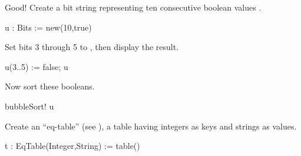 \begin{xtc}
\begin{xtccomment}
Good! Create a bit string representing ten consecutive
boolean values .
\end{xtccomment}
\begin{spadsrc}
u : Bits := new(10,true)
\end{spadsrc}
\begin{TeXOutput}
\begin{fricasmath}{7}
%
\end{fricasmath}
\end{TeXOutput}
\end{xtc}
\begin{xtc}
\begin{xtccomment}
Set bits 3 through 5 to , then display the result.
\end{xtccomment}
\begin{spadsrc}
u(3..5) := false; u
\end{spadsrc}
\begin{TeXOutput}
\begin{fricasmath}{8}
%
\end{fricasmath}
\end{TeXOutput}
\end{xtc}
\begin{xtc}
\begin{xtccomment}
Now sort these booleans.
\end{xtccomment}
\begin{spadsrc}
bubbleSort! u
\end{spadsrc}
\begin{TeXOutput}
\begin{fricasmath}{9}
%
\end{fricasmath}
\end{TeXOutput}
\end{xtc}
\begin{xtc}
\begin{xtccomment}
Create an ``eq-table'' (see ), a
table having integers as keys
and strings as values.
\end{xtccomment}
\begin{spadsrc}
t : EqTable(Integer,String) := table()
\end{spadsrc}
\begin{TeXOutput}
\begin{fricasmath}{10}
\PAREN{}%
\end{fricasmath}
\end{TeXOutput}
\end{xtc}

